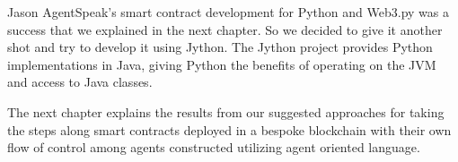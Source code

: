 \vspace{.5cm}

Jason AgentSpeak's smart contract development for Python and Web3.py was a success that we explained in the next chapter. So we decided to give it another shot and try to develop it using Jython. The Jython project provides Python implementations in Java, giving Python the benefits of operating on the JVM and access to Java classes.

\vspace{.5cm}

The next chapter explains the results from our suggested approaches for taking the steps along smart contracts deployed in a bespoke blockchain with their own flow of control among agents constructed utilizing agent oriented language.

